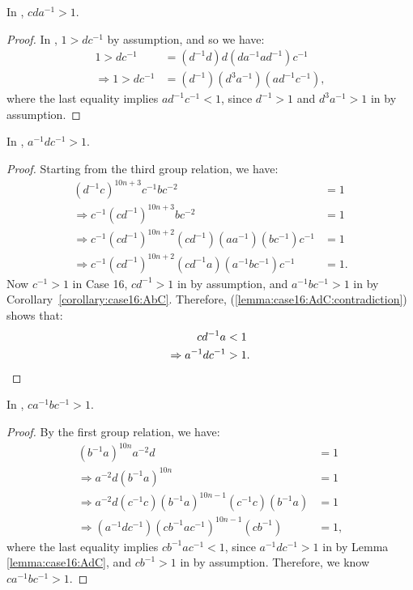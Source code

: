 \begin{lemma} In , $cda^{-1}>1$.
\label{lemma:case16:cdA}
\end{lemma}
\begin{proof} In , $1>dc^{-1}$ by assumption, and so we have:
\begin{align*}
1>dc^{-1}&=(d^{-1}d)d(da^{-1}ad^{-1})c^{-1}\\
\Rightarrow{}1>dc^{-1}&=(d^{-1})(d^{3}a^{-1})(ad^{-1}c^{-1}),
\end{align*}
where the last equality implies $ad^{-1}c^{-1}<1$, since $d^{-1}>1$ and $d^{3}a^{-1}>1$ in  by assumption.
\end{proof}

\begin{lemma} In , $a^{-1}dc^{-1}>1$.
\label{lemma:case16:AdC}
\end{lemma}
\begin{proof}
Starting from the third group relation, we have:
\begin{align}
(d^{-1}c)^{10n+3}c^{-1}bc^{-2}&=1\nonumber{}\\
\Rightarrow{}c^{-1}(cd^{-1})^{10n+3}bc^{-2}&=1\nonumber{}\\
\Rightarrow{}c^{-1}(cd^{-1})^{10n+2}(cd^{-1})(aa^{-1})(bc^{-1})c^{-1}&=1\nonumber{}\\
\Rightarrow{}c^{-1}(cd^{-1})^{10n+2}(cd^{-1}a)(a^{-1}bc^{-1})c^{-1}&=1.\label{lemma:case16:AdC:contradiction}
\end{align}
Now $c^{-1}>1$ in Case 16, $cd^{-1}>1$ in  by assumption, and $a^{-1}bc^{-1}>1$ in  by Corollary~\ref{corollary:case16:AbC}. Therefore, (\ref{lemma:case16:AdC:contradiction}) shows that:
\begin{align*}
cd^{-1}a&<1\\
\Rightarrow{}a^{-1}dc^{-1}&>1.\qedhere
\end{align*}
\end{proof}


\begin{lemma} In , $ca^{-1}bc^{-1}>1$.
\label{lemma:case16:cAbC}
\end{lemma}
\begin{proof} By the first group relation, we have:
\begin{align*}
(b^{-1}a)^{10n}a^{-2}d&=1\\
\Rightarrow{}a^{-2}d(b^{-1}a)^{10n}&=1\\
\Rightarrow{}a^{-2}d(c^{-1}c)(b^{-1}a)^{10n-1}(c^{-1}c)(b^{-1}a)&=1\\
\Rightarrow{}(a^{-1}dc^{-1})(cb^{-1}ac^{-1})^{10n-1}(cb^{-1})&=1,
\end{align*}
where the last equality implies $cb^{-1}ac^{-1}<1$, since $a^{-1}dc^{-1}>1$ in  by Lemma \ref{lemma:case16:AdC}, and $cb^{-1}>1$ in  by assumption. Therefore, we know $ca^{-1}bc^{-1}>1$.
\end{proof}

